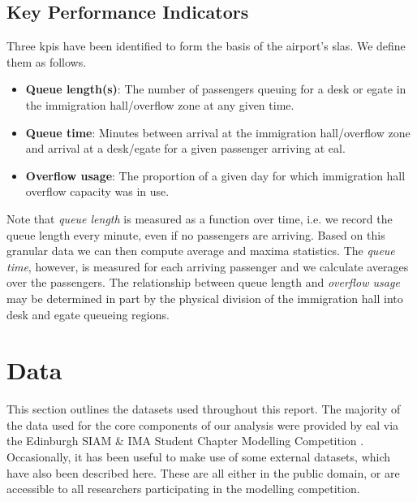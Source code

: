 \documentclass[10pt]{article}
\begin{document}
\subsection{Key Performance Indicators}

Three \glspl{kpi} have been identified to form the basis of the airport's \glspl{sla}. We define them as follows.

\begin{itemize}
    \item \textbf{Queue length(s)}: The number of passengers queuing for a desk or \gls{egate} in the immigration hall/overflow zone at any given time.
    \item \textbf{Queue time}: Minutes between arrival at the immigration hall/overflow zone and arrival at a desk/\gls{egate} for a given passenger arriving at \gls{eal}. 
    \item \textbf{Overflow usage}: The proportion of a given day for which immigration hall overflow capacity was in use.
\end{itemize}

Note that \textit{queue length} is measured as a function over time, i.e. we record the queue length every minute, even if no passengers are arriving. Based on this granular data we can then compute average and maxima statistics. The \textit{queue time}, however, is measured for each arriving passenger and we calculate averages over the passengers. The relationship between queue length and \textit{overflow usage} may be determined in part by the physical division of the immigration hall into desk and \gls{egate} queueing regions.


\section{Data}
This section outlines the datasets used throughout this report. The majority of the data used for the core components of our analysis were provided by \gls{eal} via the Edinburgh SIAM \& IMA Student Chapter Modelling Competition \cite{modelling_competition}. Occasionally, it has been useful to make use of some external datasets, which have also been described here. These are all either in the public domain, or are accessible to all researchers participating in the modelling competition. 
\end{document}
